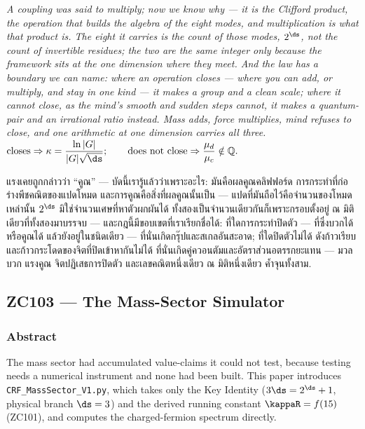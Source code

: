 \documentclass[12pt, a4paper]{article}
\begin{document}
\bigskip
\begin{center}
\textit{%
A coupling was said to multiply; now we know why --- it is the Clifford product,
the operation that builds the algebra of the eight modes, and multiplication is
what that product is. The eight it carries is the count of those modes,
$2^{\ds}$, not the count of invertible residues; the two are the same integer
only because the framework sits at the one dimension where they meet. And the
law has a boundary we can name: where an operation closes --- where you can add,
or multiply, and stay in one kind --- it makes a group and a clean scale; where
it cannot close, as the mind's smooth and sudden steps cannot, it makes a
quantum-pair and an irrational ratio instead. Mass adds, force multiplies, mind
refuses to close, and one arithmetic at one dimension carries all three.}\\[0.5em]
$\displaystyle
  \text{closes}\Rightarrow \kappa=\frac{\ln|G|}{|G|\sqrt{\ds}};
  \qquad
  \text{does not close}\Rightarrow \frac{\mu_d}{\mu_c}\notin\mathbb{Q}.$

\medskip
{\thaifont
แรงเคยถูกกล่าวว่า ``คูณ'' --- บัดนี้เรารู้แล้วว่าเพราะอะไร: มันคือผลคูณคลิฟฟอร์ด การกระทำที่ก่อร่างพีชคณิตของแปดโหมด และการคูณคือสิ่งที่ผลคูณนั้นเป็น ---
แปดที่มันถือไว้คือจำนวนของโหมดเหล่านั้น $2^{\ds}$ มิใช่จำนวนเศษที่หาตัวผกผันได้ ทั้งสองเป็นจำนวนเดียวกันก็เพราะกรอบตั้งอยู่ ณ มิติเดียวที่ทั้งสองมาบรรจบ ---
และกฎนี้มีขอบเขตที่เราเรียกชื่อได้: ที่ใดการกระทำปิดตัว --- ที่ซึ่งบวกได้ หรือคูณได้ แล้วยังอยู่ในชนิดเดียว --- ที่นั่นเกิดกรุ๊ปและสเกลอันสะอาด; ที่ใดปิดตัวไม่ได้ ดังก้าวเรียบและก้าวกระโดดของจิตที่ปิดเข้าหากันไม่ได้ ที่นั่นเกิดคู่ควอนตัมและอัตราส่วนอตรรกยะแทน ---
มวลบวก แรงคูณ จิตปฏิเสธการปิดตัว และเลขคณิตหนึ่งเดียว ณ มิติหนึ่งเดียว ค้ำจุนทั้งสาม.}
\end{center}



\subsection{ZC103 --- The Mass-Sector Simulator}
\subsubsection*{Abstract}
\sloppy
The mass sector had accumulated value-claims it could not test, because
testing needs a numerical instrument and none had been built. This paper
introduces \texttt{CRF\_MassSector\_V1.py}, which takes only the Key Identity
($3\ds=2^{\ds}+1$, physical branch $\ds=3$) and the derived running constant
$\kappaR=f(15)$ (ZC101), and computes the charged-fermion spectrum directly.
\end{document}
